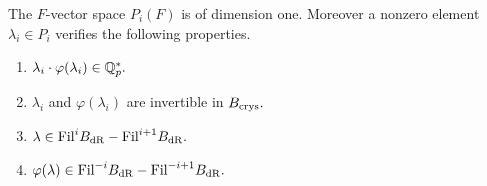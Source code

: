 \begin{proposition}
\notready\label{lemmapi}
The $F$-vector space  $P_i(F)$ is of dimension one. Moreover a nonzero element $\lambda_i \in P_i$ verifies the following properties.
\begin{enumerate}
 \item\label{preciso1} $\lambda_i \cdot\varphi(\lambda_i) \in \mathbb{Q}^*_p.$
  \item\label{preciso4} $\lambda_i $ and $\varphi(\lambda_i)$ are invertible in $B_{\textnormal{crys}}.$
\item\label{preciso2} $\lambda \in \textnormal{Fil} ^i B_{\mathrm{dR}}-\textnormal{Fil} ^{i+1} B_{\mathrm{dR}}.$
\item\label{preciso3} $\varphi(\lambda) \in \textnormal{Fil} ^{-i} B_{\mathrm{dR}}-\textnormal{Fil} ^{-i+1} B_{\mathrm{dR}}.$
\end{enumerate}
\end{proposition}

